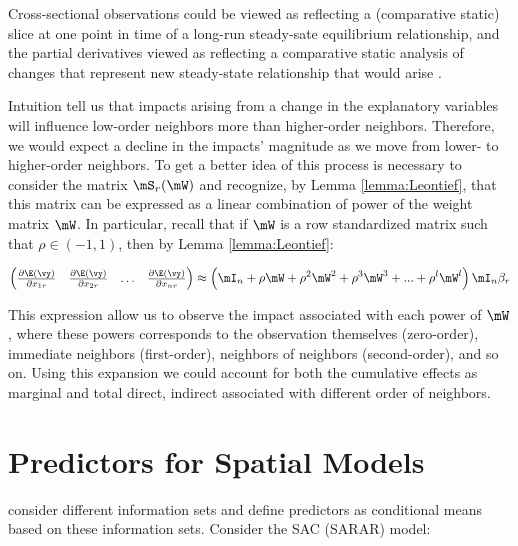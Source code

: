 \documentclass[english,12pt]{book}\usepackage[]{graphicx}\usepackage[]{xcolor}
\begin{document}
\begin{remark}
Cross-sectional observations could be viewed as reflecting a (comparative static) slice at one point in time of a long-run steady-sate equilibrium relationship, and the partial derivatives viewed as reflecting a comparative static analysis of changes that represent new steady-state relationship that would arise \citep{lesage2014regional}.
\end{remark}

Intuition tell us that impacts arising from a change in the explanatory variables will influence low-order neighbors more than higher-order neighbors. Therefore, we would expect a decline in the impacts' magnitude as we move from lower- to higher-order neighbors. To get a better idea of this process is necessary to consider the matrix $\mS_r(\mW)$ and recognize, by Lemma \ref{lemma:Leontief}, that this matrix can be expressed as a linear combination of power of the weight matrix $\mW$. In particular, recall that if $\mW$ is a row standardized matrix such that $\rho \in (-1, 1)$, then by Lemma \ref{lemma:Leontief}:

\begin{equation}
  \begin{pmatrix}
  \frac{\partial \E(\vy)}{\partial x_{1r}} & \frac{\partial \E(\vy)}{\partial x_{2r}} & \hdots & \frac{\partial \E(\vy)}{\partial x_{nr}} 
   \end{pmatrix} \approx \left(\mI_n  + \rho \mW + \rho^2\mW^2 + \rho^3\mW^3 + ... + \rho^l\mW^l\right)\mI_n\beta_r  
\end{equation}
    
This expression allow us to observe the impact associated with each power of $\mW$, where these powers corresponds to the observation themselves (zero-order), immediate neighbors (first-order), neighbors of neighbors (second-order), and so on. Using this expansion we could account for both the cumulative effects as marginal and total direct, indirect associated with different order of neighbors.

\section{Predictors for Spatial Models}

\cite{kelejian2007relative} consider different information sets and define predictors as conditional means based on these information sets. Consider the SAC (SARAR) model:
\end{document}
